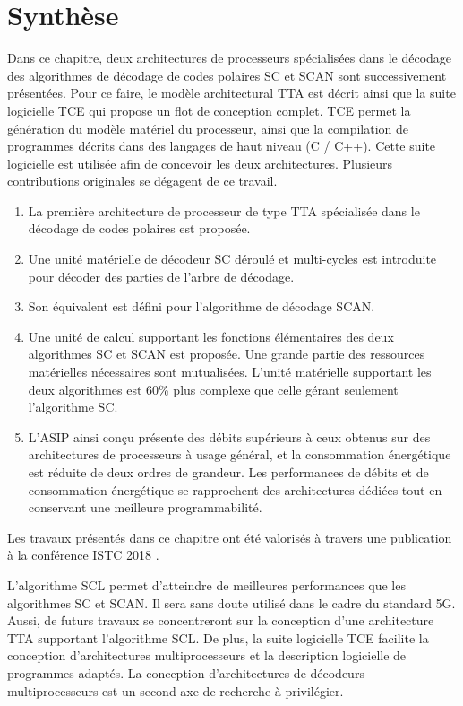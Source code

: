 \section{Synthèse}


Dans ce chapitre, deux architectures de processeurs spécialisées dans le décodage des algorithmes de décodage de codes polaires SC et SCAN sont successivement présentées. Pour ce faire, le modèle architectural TTA est décrit ainsi que la suite logicielle TCE qui propose un flot de conception complet. TCE permet la génération du modèle matériel du processeur, ainsi que la compilation de programmes décrits dans des langages de haut niveau (C / C++). Cette suite logicielle est utilisée afin de concevoir les deux architectures. Plusieurs contributions originales se dégagent de ce travail.

\begin{enumerate}[label=(\roman*)]
  \item La première architecture de processeur de type TTA spécialisée dans le décodage de codes polaires est proposée.
  \item Une unité matérielle de décodeur SC déroulé et multi-cycles est introduite pour décoder des parties de l'arbre de décodage.
  \item Son équivalent est défini pour l'algorithme de décodage SCAN.
  \item Une unité de calcul supportant les fonctions élémentaires des deux algorithmes SC et SCAN est proposée. Une grande partie des ressources matérielles nécessaires sont mutualisées. L'unité matérielle supportant les deux algorithmes est 60\% plus complexe que celle gérant seulement l'algorithme SC.
  \item L'ASIP ainsi conçu présente des débits supérieurs à ceux obtenus sur des architectures de processeurs à usage général, et la consommation énergétique est réduite de deux ordres de grandeur. Les performances de débits et de consommation énergétique se rapprochent des architectures dédiées tout en conservant une meilleure programmabilité.
\end{enumerate}

Les travaux présentés dans ce chapitre ont été valorisés à travers une publication à la conférence ISTC 2018 .

L'algorithme SCL permet d'atteindre de meilleures performances que les algorithmes SC et SCAN. Il sera sans doute utilisé dans le cadre du standard 5G. Aussi, de futurs travaux se concentreront sur la conception d'une architecture TTA supportant l'algorithme SCL. De plus, la suite logicielle TCE facilite la conception d'architectures multiprocesseurs et la description logicielle de programmes adaptés. La conception d'architectures de décodeurs multiprocesseurs est un second axe de recherche à privilégier.


